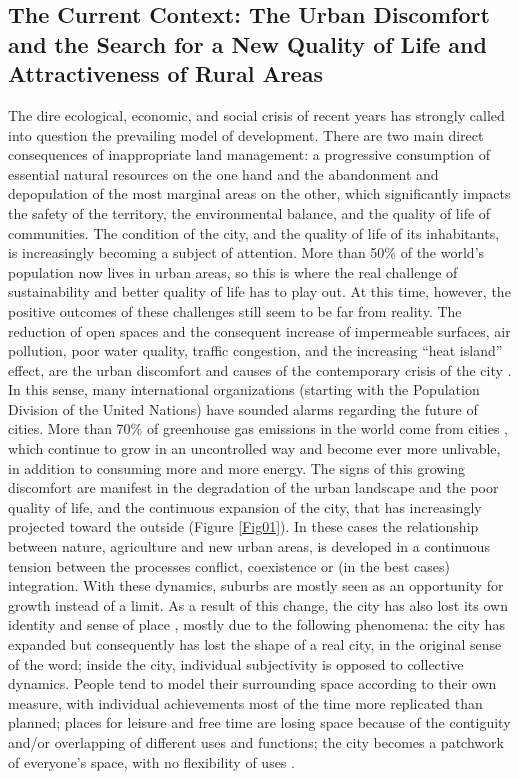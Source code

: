 \documentclass[10pt,a4paper]{article}
\begin{document}
\begin{multicols}{2}
\section{The Current Context: The Urban Discomfort and the Search for a New Quality of Life and Attractiveness of Rural Areas}
\noindent The dire ecological, economic, and social crisis of recent years has strongly called into question the prevailing model of development. There are two main direct consequences of inappropriate land management: a progressive consumption of essential natural resources on the one hand and the abandonment and depopulation of the most marginal areas on the other, which significantly impacts the safety of the territory, the environmental balance, and the quality of life of communities. The condition of the city, and the quality of life of its inhabitants, is increasingly becoming a subject of attention. More than 50\% of the world's population now lives in urban areas, so this is where the real challenge of sustainability and better quality of life has to play out. At this time, however, the positive outcomes of these challenges still seem to be far from reality. The reduction of open spaces and the consequent increase of impermeable surfaces, air pollution, poor water quality, traffic congestion, and the increasing ``heat island'' effect, are the urban discomfort and causes of the contemporary crisis of the city \citep{r01}. In this sense, many international organizations (starting with the Population Division of the United Nations) have sounded alarms regarding the future of cities. More than 70\% of greenhouse gas emissions in the world come from cities \citep{r02}, which continue to grow in an uncontrolled way and become ever more unlivable, in addition to consuming more and more energy. The signs of this growing discomfort are manifest in the degradation of the urban landscape and the poor quality of life, and the continuous expansion of the city, that has increasingly projected toward the outside (Figure \ref{Fig01}). In these cases the relationship between nature, agriculture and new urban areas, is developed in a continuous tension between the processes conflict, coexistence or (in the best cases) integration. With these dynamics, suburbs are mostly seen as an opportunity for growth instead of a limit. As a result of this change, the city has also lost its own identity and sense of place \citep{r03, r04, r05, r06}, mostly due to the following phenomena: the city has expanded but consequently has lost the shape of a real city, in the original sense of the word; inside the city, individual subjectivity is opposed to collective dynamics. People tend to model their surrounding space according to their own measure, with individual achievements most of the time more replicated than planned; places for leisure and free time are losing space because of the contiguity and/or overlapping of different uses and functions; the city becomes a patchwork of everyone's space, with no flexibility of uses \citep{r06}. 


\end{multicols}
\end{document}
